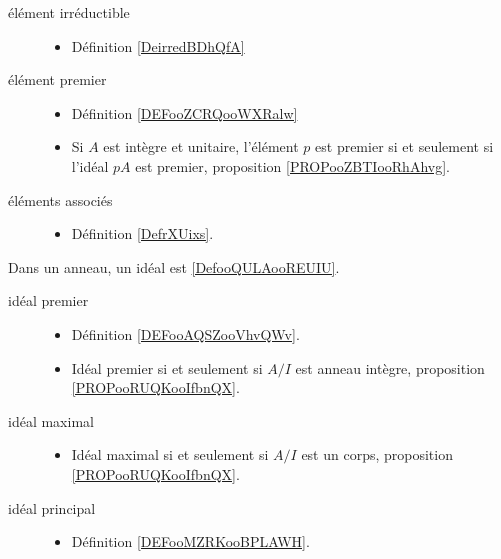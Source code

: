 \begin{description}
	\item[élément irréductible]\hspace{1cm}
	\begin{itemize}
		\item Définition \ref{DeirredBDhQfA}
	\end{itemize}
	\item[élément premier]\hspace{1cm}
	\begin{itemize}
		\item Définition \ref{DEFooZCRQooWXRalw}
		\item
		      Si \( A\) est intègre et unitaire, l'élément \( p\) est premier si et seulement si l'idéal \( pA\) est premier, proposition \ref{PROPooZBTIooRhAhvg}.
	\end{itemize}
	\item[éléments associés]\hspace{1cm}
	\begin{itemize}
		\item Définition \ref{DefrXUixs}.
	\end{itemize}
\end{description}

Dans un anneau, un idéal est \ref{DefooQULAooREUIU}.
\begin{description}
	\item[idéal premier]\hspace{1cm}
	\begin{itemize}
		\item
		      Définition \ref{DEFooAQSZooVhvQWv}.
		\item Idéal premier si et seulement si \( A/I\) est anneau intègre, proposition \ref{PROPooRUQKooIfbnQX}.
	\end{itemize}
	\item[idéal maximal]\hspace{1cm}
	\begin{itemize}
		\item
		      Idéal maximal si et seulement si \( A/I\) est un corps, proposition \ref{PROPooRUQKooIfbnQX}.
	\end{itemize}
	\item[idéal principal]\hspace{1cm}
	\begin{itemize}
		\item
		      Définition \ref{DEFooMZRKooBPLAWH}.
	\end{itemize}
\end{description}
